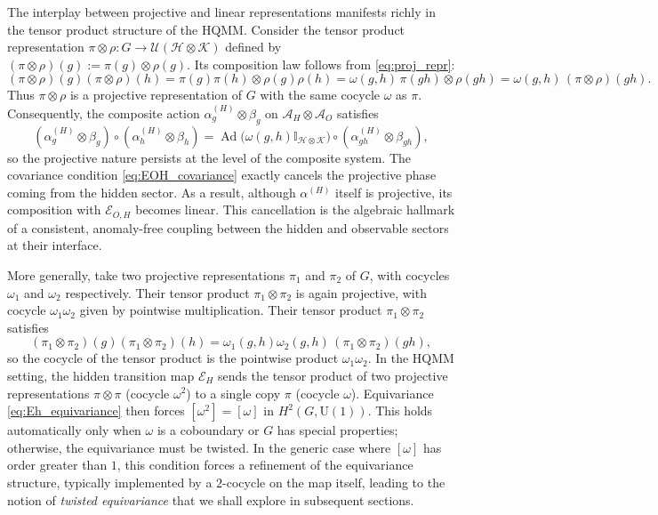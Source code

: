 \documentclass[12pt,a4paper]{article}
\begin{document}
The interplay between projective and linear representations manifests richly in the tensor product structure of the HQMM. Consider the tensor product representation \(\pi \otimes \rho: G \to \mathcal{U}(\mathcal{H} \otimes \mathcal{K})\) defined by \((\pi \otimes \rho)(g) := \pi(g) \otimes \rho(g)\). Its composition law follows from \eqref{eq:proj_repr}:
\[
(\pi \otimes \rho)(g)(\pi \otimes \rho)(h) = \pi(g)\pi(h) \otimes \rho(g)\rho(h) = \omega(g,h) \, \pi(gh) \otimes \rho(gh) = \omega(g,h) \, (\pi \otimes \rho)(gh).
\]
Thus \(\pi \otimes \rho\) is a projective representation of \(G\) with the same cocycle \(\omega\) as \(\pi\). Consequently, the composite action \(\alpha_g^{(H)} \otimes \beta_g\) on \(\mathcal{A}_H \otimes \mathcal{A}_O\) satisfies
\[
(\alpha_g^{(H)} \otimes \beta_g) \circ (\alpha_h^{(H)} \otimes \beta_h) = \operatorname{Ad}\bigl(\omega(g,h) \mathbb{I}_{\mathcal{H} \otimes \mathcal{K}}\bigr) \circ (\alpha_{gh}^{(H)} \otimes \beta_{gh}),
\]
so the projective nature persists at the level of the composite system. The covariance condition \eqref{eq:EOH_covariance} exactly cancels the projective phase coming from the hidden sector. As a result, although $\alpha^{(H)}$ itself is projective, its composition with $\mathcal{E}_{O,H}$ becomes linear. This cancellation is the algebraic hallmark of a consistent, anomaly-free coupling between the hidden and observable sectors at their interface.

More generally, take two projective representations $\pi_1$ and $\pi_2$ of $G$, with cocycles $\omega_1$ and $\omega_2$ respectively. Their tensor product $\pi_1 \otimes \pi_2$ is again projective, with cocycle $\omega_1 \omega_2$ given by pointwise multiplication.
 Their tensor product \(\pi_1 \otimes \pi_2\) satisfies
\[
(\pi_1 \otimes \pi_2)(g)(\pi_1 \otimes \pi_2)(h) = \omega_1(g,h)\omega_2(g,h) \, (\pi_1 \otimes \pi_2)(gh),
\]
so the cocycle of the tensor product is the pointwise product \(\omega_1\omega_2\). In the HQMM setting, the hidden transition map $\mathcal{E}_H$ sends the tensor product of two projective representations $\pi \otimes \pi$ (cocycle $\omega^2$) to a single copy $\pi$ (cocycle $\omega$). Equivariance \eqref{eq:Eh_equivariance} then forces $[\omega^2] = [\omega]$ in $H^2(G, \mathrm{U}(1))$. This holds automatically only when $\omega$ is a coboundary or $G$ has special properties; otherwise, the equivariance must be twisted. In the generic case where \([\omega]\) has order greater than \(1\), this condition forces a refinement of the equivariance structure, typically implemented by a \(2\)-cocycle on the map itself, leading to the notion of \textit{twisted equivariance} that we shall explore in subsequent sections.
\end{document}
